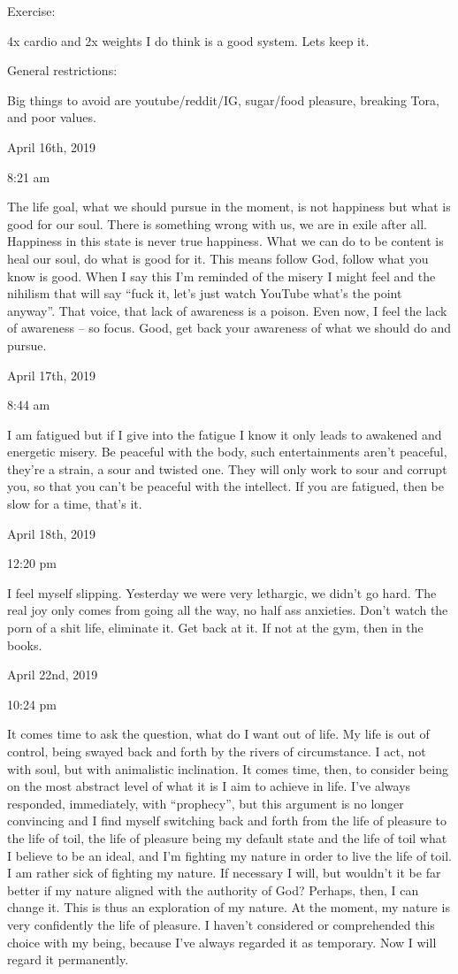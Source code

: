 Exercise:

4x cardio and 2x weights I do think is a good system. Lets keep it.

General restrictions:

Big things to avoid are youtube/reddit/IG, sugar/food pleasure, breaking
Tora, and poor values.

\bigskip
\bigskip
April 16th, 2019

8:21 am

The life goal, what we should pursue in the moment, is not happiness but
what is good for our soul. There is something wrong with us, we are in
exile after all. Happiness in this state is never true happiness. What
we can do to be content is heal our soul, do what is good for it. This
means follow God, follow what you know is good. When I say this I'm
reminded of the misery I might feel and the nihilism that will say
``fuck it, let's just watch YouTube what's the point anyway''. That
voice, that lack of awareness is a poison. Even now, I feel the lack of
awareness -- so focus. Good, get back your awareness of what we should
do and pursue.

\bigskip
\bigskip
April 17th, 2019

8:44 am

I am fatigued but if I give into the fatigue I know it only leads to
awakened and energetic misery. Be peaceful with the body, such
entertainments aren't peaceful, they're a strain, a sour and twisted
one. They will only work to sour and corrupt you, so that you can't be
peaceful with the intellect. If you are fatigued, then be slow for a
time, that's it.

\bigskip
\bigskip
April 18th, 2019

12:20 pm

I feel myself slipping. Yesterday we were very lethargic, we didn't go
hard. The real joy only comes from going all the way, no half ass
anxieties. Don't watch the porn of a shit life, eliminate it. Get back
at it. If not at the gym, then in the books.

\bigskip
\bigskip
April 22nd, 2019

10:24 pm

It comes time to ask the question, what do I want out of life. My life
is out of control, being swayed back and forth by the rivers of
circumstance. I act, not with soul, but with animalistic inclination. It
comes time, then, to consider being on the most abstract level of what
it is I aim to achieve in life. I've always responded, immediately, with
``prophecy'', but this argument is no longer convincing and I find
myself switching back and forth from the life of pleasure to the life of
toil, the life of pleasure being my default state and the life of toil
what I believe to be an ideal, and I'm fighting my nature in order to
live the life of toil. I am rather sick of fighting my nature. If
necessary I will, but wouldn't it be far better if my nature aligned
with the authority of God? Perhaps, then, I can change it. This is thus
an exploration of my nature. At the moment, my nature is very
confidently the life of pleasure. I haven't considered or comprehended
this choice with my being, because I've always regarded it as temporary.
Now I will regard it permanently.

